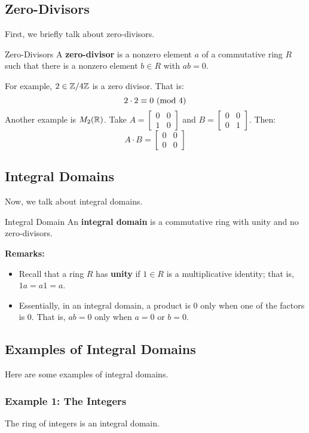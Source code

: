 \documentclass[letterpaper]{article}
\begin{document}
\subsection{Zero-Divisors}
First, we briefly talk about zero-divisors. 
\begin{definition}{Zero-Divisors}{}
    A \textbf{zero-divisor} is a nonzero element $a$ of a commutative ring $R$ such that there is a nonzero element $b \in R$ with $ab = 0$. 
\end{definition}
For example, $2 \in \mathbb{Z} / 4 \mathbb{Z}$ is a zero divisor. That is: 
\[2 \cdot 2 \equiv 0 \ (\mathrm{mod}\ 4)\]
Another example is $M_{2}(\mathbb{R})$. Take $A = \begin{bmatrix}
    0 & 0 \\ 1 & 0 
\end{bmatrix}$ and $B = \begin{bmatrix}
    0 & 0 \\ 0 & 1
\end{bmatrix}$. Then:
\[A \cdot B = \begin{bmatrix}
    0 & 0 \\ 0 & 0
\end{bmatrix}\] 

\subsection{Integral Domains}
Now, we talk about integral domains. 
\begin{definition}{Integral Domain}{}
    An \textbf{integral domain} is a commutative ring with unity and no zero-divisors.
\end{definition}
\textbf{Remarks:}
\begin{itemize}
    \item Recall that a ring $R$ has \textbf{unity} if $1 \in R$ is a multiplicative identity; that is, $1a = a1 = a$. 
    \item Essentially, in an integral domain, a product is 0 only when one of the factors is 0. That is, $ab = 0$ only when $a = 0$ or $b = 0$. 
\end{itemize}

\subsection{Examples of Integral Domains}
Here are some examples of integral domains. 

\subsubsection{Example 1: The Integers}
The ring of integers is an integral domain. 
\end{document}
